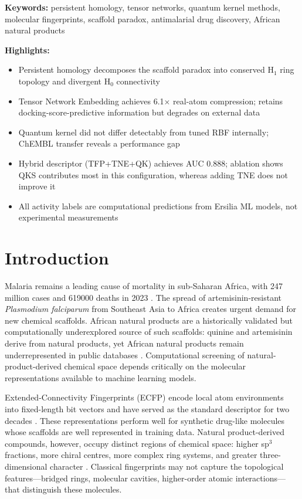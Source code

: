 \documentclass[11pt,a4paper]{article}
\begin{document}
\noindent\textbf{Keywords:} persistent homology, tensor networks, quantum kernel methods, molecular fingerprints, scaffold paradox, antimalarial drug discovery, African natural products

\noindent\textbf{Highlights:}
\begin{itemize}
\item Persistent homology decomposes the scaffold paradox into conserved H$_1$ ring topology and divergent H$_0$ connectivity
\item Tensor Network Embedding achieves \num{6.1}$\times$ real-atom compression; retains docking-score-predictive information but degrades on external data
\item Quantum kernel did not differ detectably from tuned RBF internally; ChEMBL transfer reveals a performance gap
\item Hybrid descriptor (TFP+TNE+QK) achieves AUC \num{0.888}; ablation shows QKS contributes most in this configuration, whereas adding TNE does not improve it
\item All activity labels are computational predictions from Ersilia ML models, not experimental measurements
\end{itemize}


\section{Introduction}

Malaria remains a leading cause of mortality in sub-Saharan Africa, with \num{247} million cases and \num{619000} deaths in 2023 \citep{who2024malariareport}. The spread of artemisinin-resistant \emph{Plasmodium falciparum} from Southeast Asia to Africa \citep{ariyey2014,ashley2018} creates urgent demand for new chemical scaffolds. African natural products are a historically validated but computationally underexplored source of such scaffolds: quinine and artemisinin derive from natural products, yet African natural products remain underrepresented in public databases \citep{anpdb_2026,value_addition_african_np_2025}. Computational screening of natural-product-derived chemical space depends critically on the molecular representations available to machine learning models.

Extended-Connectivity Fingerprints (ECFP) encode local atom environments into fixed-length bit vectors and have served as the standard descriptor for two decades \citep{ecfp_2010}. These representations perform well for synthetic drug-like molecules whose scaffolds are well represented in training data. Natural product-derived compounds, however, occupy distinct regions of chemical space: higher sp$^3$ fractions, more chiral centres, more complex ring systems, and greater three-dimensional character \citep{coconut_2021}. Classical fingerprints may not capture the topological features---bridged rings, molecular cavities, higher-order atomic interactions---that distinguish these molecules.
\end{document}
